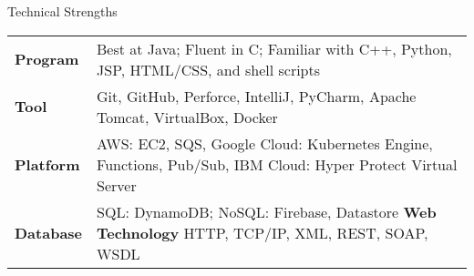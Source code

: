 \documentclass{resume} %
\begin{document}

\begin{rSection}{Technical Strengths}
\begin{tabular}{ @{} >{ \bfseries}l @{ \hspace{1ex}} l}


{\small Program} & {\small Best at Java; Fluent in C; Familiar with C++, Python, JSP, HTML/CSS, and shell scripts} \\
{\small Tool} & {Git, GitHub, Perforce, IntelliJ, PyCharm, Apache Tomcat, VirtualBox, Docker} \\
{\small Platform} & {AWS: EC2, SQS, Google Cloud: Kubernetes Engine, Functions, Pub/Sub, IBM Cloud: Hyper Protect Virtual Server}  \\
{\small Database} & {SQL: DynamoDB; NoSQL: Firebase, Datastore {\bf Web Technology} HTTP, TCP/IP, XML, REST, SOAP, WSDL}  \\
\end{tabular}


\end{rSection}
\end{document}
